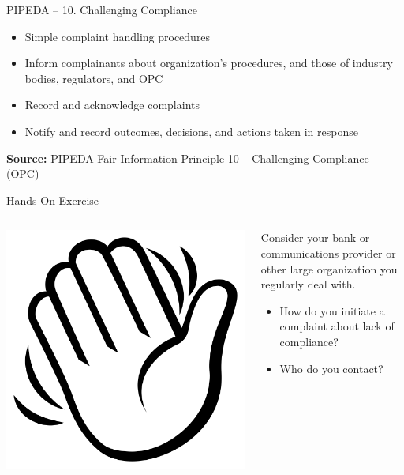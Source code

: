 \documentclass[ignorenonframetext,xcolor=x11names]{beamer}
\begin{document}
\begin{frame}{PIPEDA -- 10. Challenging Compliance}
\begin{itemize}
   \item Simple complaint handling procedures
   \item Inform complainants about organization's procedures, and those of industry bodies, regulators, and OPC
   \item Record and acknowledge complaints
   \item Notify and record outcomes, decisions, and actions taken in response
\end{itemize}

\vspace{\baselineskip}
\scriptsize \textbf{Source:} \href{https://www.priv.gc.ca/en/privacy-topics/privacy-laws-in-canada/the-personal-information-protection-and-electronic-documents-act-pipeda/p_principle/principles/p_compliance/}{PIPEDA Fair Information Principle 10 -- Challenging Compliance (OPC)}
\end{frame}   


\begin{frame}{Hands-On Exercise}
\begin{columns}
\begin{column}{0.2\textwidth}
\href{https://commons.wikimedia.org/wiki/File:Emojione_BW_1F44B.svg}{\includegraphics[width=\textwidth]{hand.png}}
\end{column}
\begin{column}{0.8\textwidth}

Consider your bank or communications provider or other large organization you regularly deal with. 
\begin{itemize}
  \item How do you initiate a complaint about lack of compliance?
  \item Who do you contact?
\end{itemize}
\end{column}
\end{columns}
\end{frame}
\end{document}
